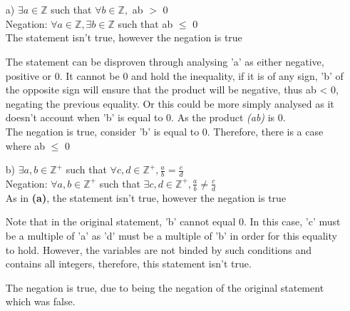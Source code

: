 \documentclass{article}
\begin{document}
\section{}

\begin{enumerate}
\item[a)] $\exists a \in \mathbb{Z}$ such that $\forall b \in \mathbb{Z},$ ab $>$ 0 \\

Negation: $\forall a \in \mathbb{Z}, \exists b \in \mathbb{Z}$ such that ab $\leq$ 0 \\

The statement isn't true, however the negation is true

The statement can be disproven through analysing 'a' as either negative, positive or 0. It cannot be 0 and hold the inequality,
if it is of any sign, 'b' of the opposite sign will ensure that the product will be negative, thus ab < 0, negating the previous equality.
Or this could be more simply analysed as it doesn't account when 'b' is equal to 0. As the product \textit{(ab)} is 0. \\

The negation is true, consider 'b' is equal to 0. Therefore, there is a case where ab $\leq$ 0

\item[b)]
$\exists a, b \in \mathbb{Z}^{+}$ such that $\forall c, d \in \mathbb{Z}^{+}, \frac{a}{b} = \frac{c}{d}$ \\

Negation: $\forall a, b \in \mathbb{Z}^{+}$ such that $\exists c, d \in \mathbb{Z}^{+}, \frac{a}{b} \ne \frac{c}{d}$ \\

As in \textbf{(a)}, the statement isn't true, however the negation is true

Note that in the original statement, 'b' cannot equal 0. In this case, 'c' must be a multiple of 'a' as 'd' must be a multiple of 'b' in order
for this equality to hold. However, the variables are not binded by such conditions and contains all
integers, therefore, this statement isn't true.

The negation is true, due to being the negation of the original statement which was false.

\end{enumerate}
\end{document}
